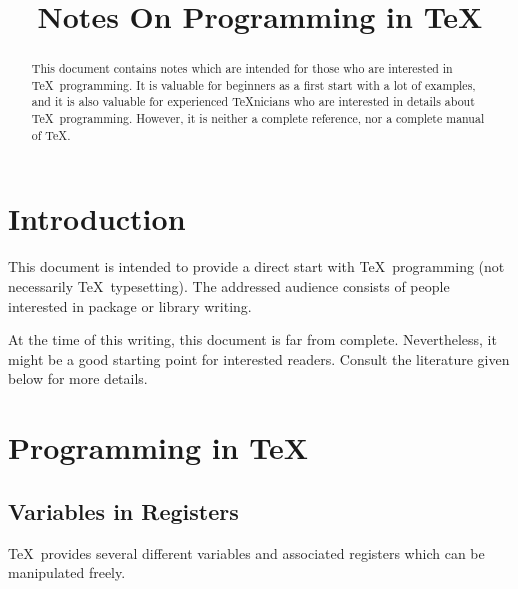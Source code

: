 \documentclass[a4paper,doc2]{ltxdoc}
\title{Notes On Programming in \TeX}%
\begin{document}
\maketitle
\begin{abstract}%
	This document contains notes which are intended for those who are interested in \TeX\ programming. It is valuable for beginners as a first start with a lot of examples, and it is also valuable for experienced \TeX nicians who are interested in details about \TeX\ programming. However, it is neither a complete reference, nor a complete manual of \TeX.
\end{abstract}
\tableofcontents
\section{Introduction}
This document is intended to provide a direct start with \TeX\ programming (not necessarily \TeX\ typesetting). The addressed audience consists of people interested in package or library writing.

At the time of this writing, this document is far from complete. Nevertheless, it might be a good starting point for interested readers. Consult the literature given below for more details.

\section{Programming in \TeX}
\subsection{Variables in Registers}
\label{sec:variables}
\TeX\ provides several different variables and associated registers which can be manipulated freely.
\end{document}

